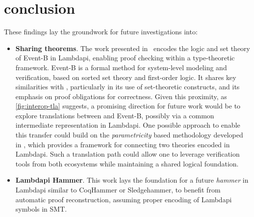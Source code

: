 \chapter{conclusion}\label{ch:conclusion}

These findings lay the groundwork for future investigations into:

\begin{itemize}
    \item[] \textbf{Sharing \tlaplus theorems}. The work presented in~\cite{eventb2lp} encodes the logic and set theory of Event-B in Lambdapi, enabling proof checking within a type-theoretic framework.
Event-B is a formal method for system-level modeling and verification, based on sorted set theory and first-order logic.
It shares key similarities with \tlaplus, particularly in its use of set-theoretic constructs, and its emphasis on proof obligations for correctness.
Given this proximity, as \cref{fig:interop-tla} suggests, a promising direction for future work would be to explore translations between \tlaplus and Event-B, possibly via a common intermediate representation in Lambdapi.
One possible approach to enable this transfer could build on the \emph{parametricity} \cite{theorem-for-free,parametricity} based methodology developed in \cite{parametricity-lp}, which provides a framework for connecting two theories encoded in Lambdapi. 
Such a translation path could allow one to leverage verification tools from both ecosystems while maintaining a shared logical foundation.
    \item[] \textbf{Lambdapi Hammer}. This work lays the foundation for a future \emph{hammer} in Lambdapi similar to CoqHammer or Sledgehammer, to benefit from automatic proof reconstruction, assuming proper encoding of Lambdapi symbols in SMT.
\end{itemize}
